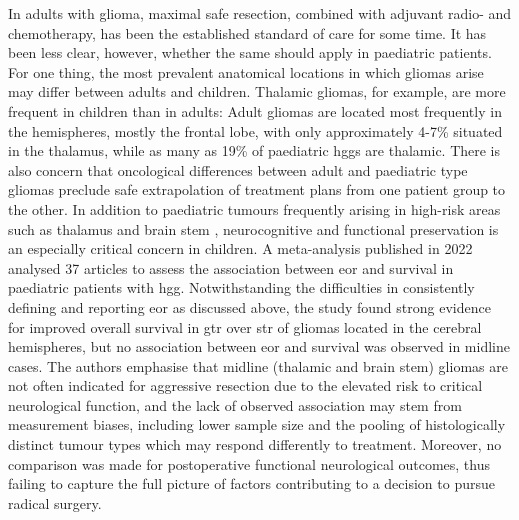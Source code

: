 In adults with glioma, maximal safe resection, combined with adjuvant radio- and chemotherapy, has been the established standard of care for some time.
It has been less clear, however, whether the same should apply in paediatric patients.
For one thing, the most prevalent anatomical locations in which gliomas arise may differ between adults and children\autocite{Duffau2004}.
Thalamic gliomas, for example, are more frequent in children than in adults\autocite{Cinalli2018,Palmisciano2021,GomezVecchio2021}:
Adult gliomas are located most frequently in the hemispheres, mostly the frontal lobe, with only approximately 4-7\%\autocite{GomezVecchio2021,Larjavaara2007} situated in the thalamus, while as many as 19\% of paediatric \glspl{hgg} are thalamic\autocite{McCrea2015}.
There is also concern that oncological differences between adult and paediatric type gliomas preclude safe extrapolation of treatment plans from one patient group to the other\autocite{Jones2012,Greuter2021}.
In addition to paediatric tumours frequently arising in high-risk areas such as thalamus and brain stem \autocite{Ostrom2015},  neurocognitive and functional preservation is an especially critical concern in children.
A meta-analysis published in 2022 analysed 37 articles to assess the association between \gls{eor} and survival in paediatric patients with \gls{hgg}\autocite{Hatoum2022}.
Notwithstanding the difficulties in consistently defining and reporting \gls{eor} as discussed above, the study found strong evidence for improved overall survival in \gls{gtr} over \gls{str} of gliomas located in the cerebral hemispheres, but no association between \gls{eor} and survival was observed in midline cases.
The authors emphasise that midline (thalamic and brain stem) gliomas are not often indicated for aggressive resection due to the elevated risk to critical neurological function, and the lack of observed association may stem from measurement biases, including lower sample size and the pooling of histologically distinct tumour types which may respond differently to treatment.
Moreover, no comparison was made for postoperative functional neurological outcomes, thus failing to capture the full picture of factors contributing to a decision to pursue radical surgery.

